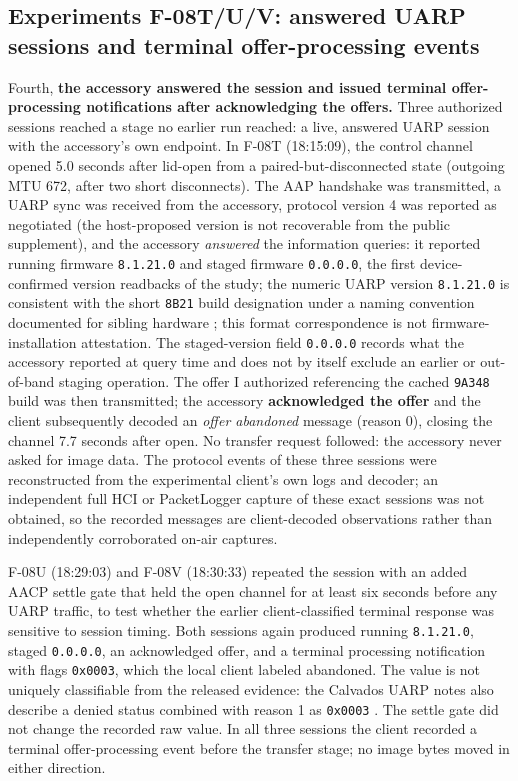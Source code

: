 \documentclass[11pt,letterpaper]{article}
\begin{document}
\subsection{Experiments F-08T/U/V: answered UARP sessions and terminal offer-processing events}
Fourth, \textbf{the accessory answered the session and issued terminal offer-processing notifications after acknowledging the offers.} Three authorized sessions reached a stage no earlier run reached: a live, answered UARP session with the accessory's own endpoint. In F-08T (18:15:09), the control channel opened 5.0 seconds after lid-open from a paired-but-disconnected state (outgoing MTU 672, after two short disconnects). The AAP handshake was transmitted, a UARP sync was received from the accessory, protocol version 4 was reported as negotiated (the host-proposed version is not recoverable from the public supplement), and the accessory \emph{answered} the information queries: it reported running firmware \texttt{8.1.21.0} and staged firmware \texttt{0.0.0.0}, the first device-confirmed version readbacks of the study; the numeric UARP version \texttt{8.1.21.0} is consistent with the short \texttt{8B21} build designation under a naming convention documented for sibling hardware \cite{calvados}; this format correspondence is not firmware-installation attestation. The staged-version field \texttt{0.0.0.0} records what the accessory reported at query time and does not by itself exclude an earlier or out-of-band staging operation. The offer I authorized referencing the cached \texttt{9A348} build was then transmitted; the accessory \textbf{acknowledged the offer} and the client subsequently decoded an \emph{offer abandoned} message (reason 0), closing the channel 7.7 seconds after open. No transfer request followed: the accessory never asked for image data. The protocol events of these three sessions were reconstructed from the experimental client's own logs and decoder; an independent full HCI or PacketLogger capture of these exact sessions was not obtained, so the recorded messages are client-decoded observations rather than independently corroborated on-air captures.

F-08U (18:29:03) and F-08V (18:30:33) repeated the session with an added AACP settle gate that held the open channel for at least six seconds before any UARP traffic, to test whether the earlier client-classified terminal response was sensitive to session timing. Both sessions again produced running \texttt{8.1.21.0}, staged \texttt{0.0.0.0}, an acknowledged offer, and a terminal processing notification with flags \texttt{0x0003}, which the local client labeled abandoned. The value is not uniquely classifiable from the released evidence: the Calvados UARP notes also describe a denied status combined with reason 1 as \texttt{0x0003} \cite{calvados}. The settle gate did not change the recorded raw value. In all three sessions the client recorded a terminal offer-processing event before the transfer stage; no image bytes moved in either direction.
\end{document}

